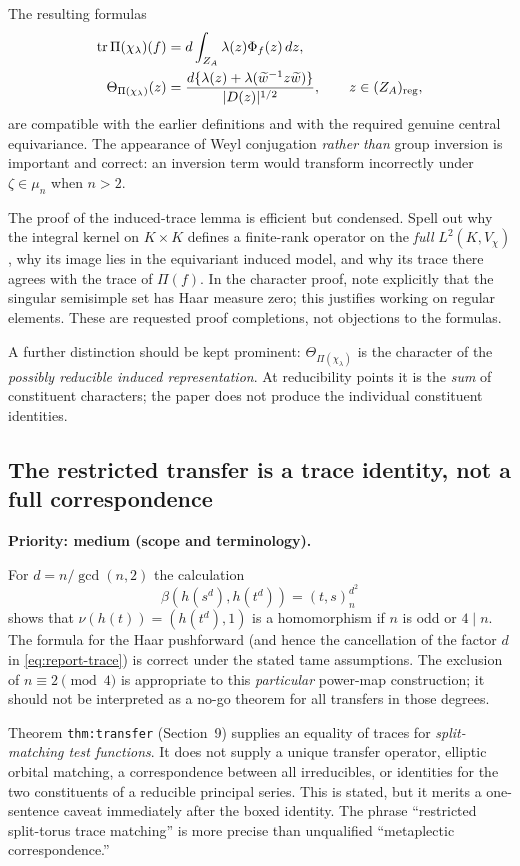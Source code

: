 \documentclass[12pt,letterpaper]{article}
\newcommand{\ZA}{Z_A}
\DeclareMathOperator{\tr}{tr}
\begin{document}
The resulting formulas
\begin{align}
\tr\Pi(\chi_\lambda)(f)
 &=d\int_{\ZA}\lambda(z)\Phi_f(z)\,dz,\label{eq:report-trace}\\
\Theta_{\Pi(\chi_\lambda)}(z)
 &=\frac{d\{\lambda(z)+\lambda(\widetilde w^{-1}z\widetilde w)\}}
 {|D(z)|^{1/2}},\qquad z\in(\ZA)_{\rm reg},\label{eq:report-character}
\end{align}
are compatible with the earlier definitions and with the required genuine central equivariance. The appearance of Weyl conjugation \emph{rather than} group inversion is important and correct: an inversion term would transform incorrectly under $\zeta\in\mu_n$ when $n>2$.

The proof of the induced-trace lemma is efficient but condensed. Spell out why the integral kernel on $K\times K$ defines a finite-rank operator on the \emph{full} $L^2(K,V_\chi)$, why its image lies in the equivariant induced model, and why its trace there agrees with the trace of $\Pi(f)$. In the character proof, note explicitly that the singular semisimple set has Haar measure zero; this justifies working on regular elements. These are requested proof completions, not objections to the formulas.

A further distinction should be kept prominent: $\Theta_{\Pi(\chi_\lambda)}$ is the character of the \emph{possibly reducible induced representation}. At reducibility points it is the \emph{sum} of constituent characters; the paper does not produce the individual constituent identities.

\subsection{The restricted transfer is a trace identity, not a full correspondence}
\textbf{Priority: medium (scope and terminology).}

For $d=n/\gcd(n,2)$ the calculation
\[
\beta(h(s^d),h(t^d))=(t,s)_n^{d^2}
\]
shows that $\nu(h(t))=(h(t^d),1)$ is a homomorphism if $n$ is odd or $4\mid n$. The formula for the Haar pushforward (and hence the cancellation of the factor $d$ in \eqref{eq:report-trace}) is correct under the stated tame assumptions. The exclusion of $n\equiv2\pmod4$ is appropriate to this \emph{particular} power-map construction; it should not be interpreted as a no-go theorem for all transfers in those degrees.

Theorem \texttt{thm:transfer} (Section~9) supplies an equality of traces for \emph{split-matching test functions}. It does not supply a unique transfer operator, elliptic orbital matching, a correspondence between all irreducibles, or identities for the two constituents of a reducible principal series. This is stated, but it merits a one-sentence caveat immediately after the boxed identity. The phrase ``restricted split-torus trace matching'' is more precise than unqualified ``metaplectic correspondence.''
\end{document}
